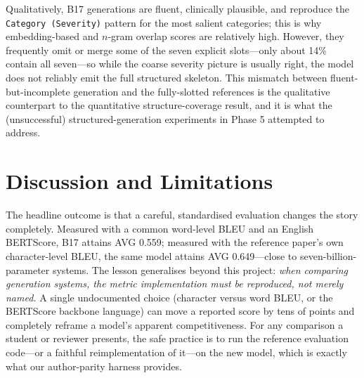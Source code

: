 \documentclass[11pt,twocolumn]{article}
\newcommand{\bt}[1]{\texttt{#1}}
\begin{document}
\vspace{0.3em}
\noindent{}
\vspace{0.4em}

Qualitatively, B17 generations are fluent, clinically plausible, and reproduce the
\bt{Category (Severity)} pattern for the most salient categories; this is why embedding-based and
$n$-gram overlap scores are relatively high. However, they frequently omit or merge some of the
seven explicit slots---only about 14\% contain all seven---so while the coarse severity picture is
usually right, the model does not reliably emit the full structured skeleton. This mismatch
between fluent-but-incomplete generation and the fully-slotted references is the qualitative
counterpart to the quantitative structure-coverage result, and it is what the (unsuccessful)
structured-generation experiments in Phase 5 attempted to address.

\section{Discussion and Limitations}
The headline outcome is that a careful, standardised evaluation changes the story completely.
Measured with a common word-level BLEU and an English BERTScore, B17 attains AVG 0.559; measured
with the reference paper's own character-level BLEU, the same model attains AVG 0.649---close to
seven-billion-parameter systems. The lesson generalises beyond this project: \emph{when comparing
generation systems, the metric implementation must be reproduced, not merely named.} A single
undocumented choice (character versus word BLEU, or the BERTScore backbone language) can move a
reported score by tens of points and completely reframe a model's apparent competitiveness. For
any comparison a student or reviewer presents, the safe practice is to run the reference
evaluation code---or a faithful reimplementation of it---on the new model, which is exactly what
our author-parity harness provides.
\end{document}
